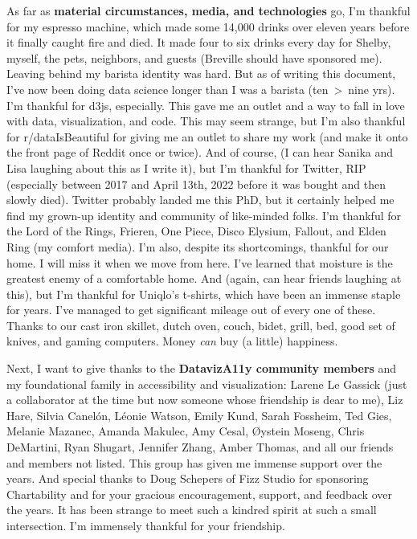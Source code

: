 \documentclass[12pt]{cmuthesis}
\begin{document}
As far as \textbf{material circumstances, media, and technologies} go, I'm thankful for my espresso machine, which made some 14,000 drinks over eleven years before it finally caught fire and died. It made four to six drinks every day for Shelby, myself, the pets, neighbors, and guests (Breville should have sponsored me). Leaving behind my barista identity was hard. But as of writing this document, I've now been doing data science longer than I was a barista (ten~\textgreater~nine yrs). I'm thankful for d3js, especially. This gave me an outlet and a way to fall in love with data, visualization, and code. This may seem strange, but I'm also thankful for r/dataIsBeautiful for giving me an outlet to share my work (and make it onto the front page of Reddit once or twice). And of course, (I can hear Sanika and Lisa laughing about this as I write it), but I'm thankful for Twitter, RIP (especially between 2017 and April 13th, 2022 before it was bought and then slowly died). Twitter probably landed me this PhD, but it certainly helped me find my grown-up identity and community of like-minded folks. I'm thankful for the Lord of the Rings, Frieren, One Piece, Disco Elysium, Fallout, and Elden Ring (my comfort media). I'm also, despite its shortcomings, thankful for our home. I will miss it when we move from here. I've learned that moisture is the greatest enemy of a comfortable home. And (again, can hear friends laughing at this), but I'm thankful for Uniqlo's t-shirts, which have been an immense staple for years. I've managed to get significant mileage out of every one of these. Thanks to our cast iron skillet, dutch oven, couch, bidet, grill, bed, good set of knives, and gaming computers. Money \textit{can} buy (a little) happiness.

Next, I want to give thanks to the \textbf{DatavizA11y community members} and my foundational family in accessibility and visualization: Larene Le Gassick (just a collaborator at the time but now someone whose friendship is dear to me), Liz Hare, Silvia Canelón, Léonie Watson, Emily Kund, Sarah Fossheim, Ted Gies, Melanie Mazanec, Amanda Makulec, Amy Cesal, Øystein Moseng, Chris DeMartini, Ryan Shugart, Jennifer Zhang, Amber Thomas, and all our friends and members not listed. This group has given me immense support over the years. And special thanks to Doug Schepers of Fizz Studio for sponsoring Chartability and for your gracious encouragement, support, and feedback over the years. It has been strange to meet such a kindred spirit at such a small intersection. I'm immensely thankful for your friendship. 
\end{document}
